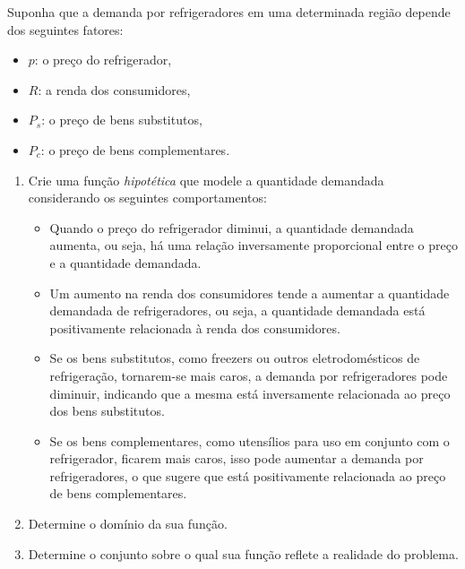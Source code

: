 \begin{exercise}{}{}
Suponha que a demanda por refrigeradores em uma determinada região depende dos seguintes fatores:
\begin{itemize}[label=\color{green!140}\textbullet]
\item \(p\): o preço do refrigerador,
\item \(R\): a renda dos consumidores,
\item \(P_s\): o preço de bens substitutos,
\item \(P_c\): o preço de bens complementares.
\end{itemize}

\begin{enumerate}[label=\color{green!140}(\alph*)]
\item Crie uma função \textit{hipotética} que modele a quantidade demandada considerando os seguintes comportamentos:
\begin{itemize}[label=\color{green!140}\textbullet]
\item Quando o preço do refrigerador diminui, a quantidade demandada aumenta, ou seja, há uma relação inversamente proporcional entre o preço e a quantidade demandada.
\item Um aumento na renda dos consumidores tende a aumentar a quantidade demandada de refrigeradores, ou seja, a quantidade demandada está positivamente relacionada à renda dos consumidores.
\item Se os bens substitutos, como freezers ou outros eletrodomésticos de refrigeração, tornarem-se mais caros, a demanda por refrigeradores pode diminuir, indicando que a mesma está inversamente relacionada ao preço dos bens substitutos. 
\item Se os bens complementares, como utensílios para uso em conjunto com o refrigerador, ficarem mais caros, isso pode aumentar a demanda por refrigeradores, o que sugere que está positivamente relacionada ao preço de bens complementares.
\end{itemize}

\item Determine o domínio da sua função.

\item Determine o conjunto sobre o qual sua função reflete a realidade do problema. 

\end{enumerate}

\end{exercise}




